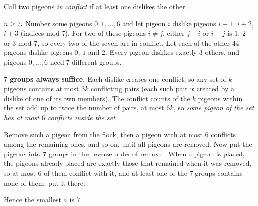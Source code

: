 Call two pigeons \emph{in conflict} if at least one dislikes the other.

\textbf{$n\ge7$.} Number some pigeons $0,1,\dots,6$ and let pigeon $i$ dislike pigeons $i+1$, $i+2$, $i+3$ (indices mod $7$). For two of these pigeons $i\ne j$, either $j-i$ or $i-j$ is $1$, $2$ or $3$ mod $7$, so every two of the seven are in conflict. Let each of the other $44$ pigeons dislike pigeons $0$, $1$ and $2$. Every pigeon dislikes exactly $3$ others, and pigeons $0,\dots,6$ need $7$ different groups.

\textbf{$7$ groups always suffice.} Each dislike creates one conflict, so any set of $k$ pigeons contains at most $3k$ conflicting pairs (each such pair is created by a dislike of one of its own members). The conflict counts of the $k$ pigeons within the set add up to twice the number of pairs, at most $6k$, so \emph{some pigeon of the set has at most $6$ conflicts inside the set}.

Remove such a pigeon from the flock, then a pigeon with at most $6$ conflicts among the remaining ones, and so on, until all pigeons are removed. Now put the pigeons into $7$ groups in the reverse order of removal. When a pigeon is placed, the pigeons already placed are exactly those that remained when it was removed, so at most $6$ of them conflict with it, and at least one of the $7$ groups contains none of them; put it there.

Hence the smallest $n$ is $\boxed{7}$.
